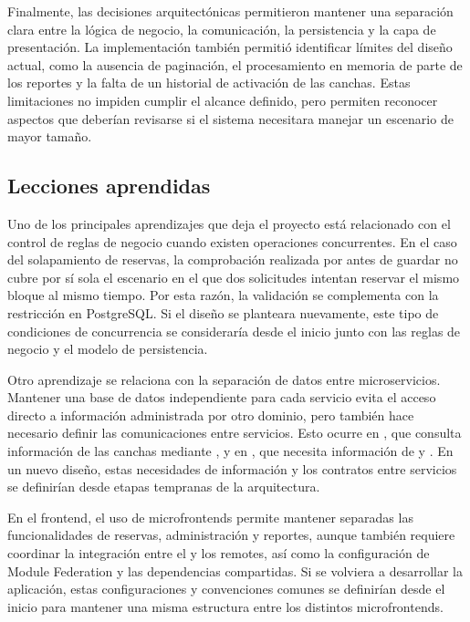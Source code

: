 Finalmente, las decisiones arquitectónicas permitieron mantener una separación
clara entre la lógica de negocio, la comunicación, la persistencia y la capa de
presentación. La implementación también permitió identificar límites del diseño
actual, como la ausencia de paginación, el procesamiento en memoria de parte de
los reportes y la falta de un historial de activación de las canchas. Estas
limitaciones no impiden cumplir el alcance definido, pero permiten reconocer
aspectos que deberían revisarse si el sistema necesitara manejar un escenario
de mayor tamaño.

\subsection{Lecciones aprendidas}
\label{sec:lecciones}

Uno de los principales aprendizajes que deja el proyecto está relacionado con
el control de reglas de negocio cuando existen operaciones concurrentes. En el
caso del solapamiento de reservas, la comprobación realizada por
 antes de guardar no cubre por sí sola el escenario en el
que dos solicitudes intentan reservar el mismo bloque al mismo tiempo. Por esta
razón, la validación se complementa con la restricción
 en PostgreSQL. Si el diseño se planteara nuevamente,
este tipo de condiciones de concurrencia se consideraría desde el inicio junto
con las reglas de negocio y el modelo de persistencia.

Otro aprendizaje se relaciona con la separación de datos entre microservicios.
Mantener una base de datos independiente para cada servicio evita el acceso
directo a información administrada por otro dominio, pero también hace
necesario definir las comunicaciones entre servicios. Esto ocurre en
, que consulta información de las canchas mediante
, y en , que necesita información de
 y . En un nuevo diseño, estas necesidades de
información y los contratos entre servicios se definirían desde etapas
tempranas de la arquitectura.

En el frontend, el uso de microfrontends permite mantener separadas las
funcionalidades de reservas, administración y reportes, aunque también requiere
coordinar la integración entre el  y los remotes, así como la
configuración de Module Federation y las dependencias compartidas. Si se
volviera a desarrollar la aplicación, estas configuraciones y convenciones
comunes se definirían desde el inicio para mantener una misma estructura entre
los distintos microfrontends.

